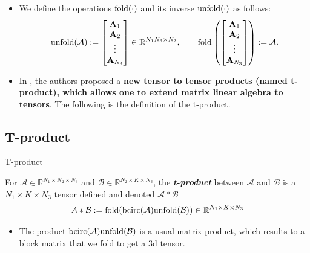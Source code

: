 \documentclass[aspectratio=169]{beamer}
\newcommand{\mcalB}{\fm B}
\def\r{\right}
\def\mbf{\mathbf}
\def\bcirc{{\rm bcirc}}
\def\unfold{{\rm unfold}}
\def\fold{{\rm fold}}
\def\mcala{\mathcal A}
\def\mcalb{\mathcal B}
\def\mbbr{\mathbb R}
\newcommand{\bem}{\begin{bmatrix}}\newcommand{\eem}{\end{bmatrix}}
\def\fm#1{\mathcal{#1}}
\def\r{\mathbb{R}}
\def\fm#1{\mathcal{#1}}
\def\r{\mathbb{R}}
\begin{document}
\begin{frame}{}
\begin{itemize}
\item We define the operations $\fold(\cdot)$ and its inverse $\unfold(\cdot)$ as follows:
$$
\unfold(\mcala):=\bem\mbf A_1\\ \mbf A_2\\ \vdots\\ \mbf A_{N_3}\eem\in\mbbr^{N_1N_3\times N_2},\qquad \fold\left(\bem\mbf A_1\\ \mbf A_2\\ \vdots\\ \mbf A_{N_3}\eem\right):=\mcala.
$$ 
\item In \cite{kilmer2013third}, the authors proposed a \textbf{new tensor to tensor products (named t-product), which allows one to extend matrix linear algebra to tensors}. The following is the definition of the t-product.
\end{itemize}
\end{frame}
\subsection{T-product}
\begin{frame}{T-product}
\begin{definition}
    For $\mcala\in\mbbr^{N_1\times N_2\times N_3}$ and $\mcalb\in\mbbr^{N_2\times K\times N_3}$, the {\it \textbf{t-product}} between $\mcala$ and $\mcalb $ is  a $ N_1\times K\times N_3$ tensor  defined and denoted  $\mcala*\mcalb$ 
$$
\mcala*\mcalb:=\fold(\bcirc(\mcala)\unfold(\mcalb))\in \r^{N_1\times K\times N_3}
$$
\end{definition}
\begin{itemize}
    \item The product $\bcirc(\mcala) \unfold(\mcalB)$ is a usual matrix product, which results to a  block matrix that we fold to get a 3d tensor.
\end{itemize}
\end{frame}
\end{document}
